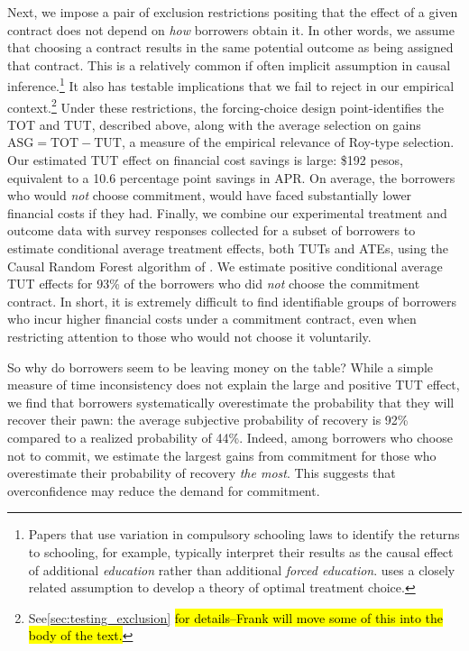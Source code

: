 \documentclass[12pt, a4paper]{article}
\begin{document}
Next, we impose a pair of exclusion restrictions positing that the effect of a given contract does not depend on \emph{how} borrowers obtain it. In other words, we assume that choosing a contract results in the same potential outcome as being assigned that contract. This is a relatively common if often implicit assumption in causal inference.\footnote{Papers that use variation in compulsory schooling laws to identify the returns to schooling, for example, typically interpret their results as the causal effect of additional \emph{education} rather than additional \emph{forced education}. \cite{chamberlain2011bayesian} uses a closely related assumption to develop a theory of optimal treatment choice.} 
It also has testable implications that we fail to reject in our empirical context.\footnote{See\autoref{sec:testing_exclusion} \hl{for details--Frank will move some of this into the body of the text.}}
Under these restrictions, the forcing-choice design point-identifies the TOT and TUT, described above, along with the average selection on gains $\text{ASG} = \text{TOT} - \text{TUT}$, a measure of the empirical relevance of Roy-type selection.
Our estimated TUT effect on financial cost savings is large: \$192 pesos, equivalent to a 10.6 percentage point savings in APR. On average, the borrowers who would \emph{not} choose commitment, would have faced substantially lower financial costs if they had. 
Finally, we combine our experimental treatment and outcome data with survey responses collected for a subset of borrowers to estimate conditional average treatment effects, both TUTs and ATEs, using the Causal Random Forest algorithm of \cite{atheygrf}. We estimate positive conditional average TUT effects for 93\% of the borrowers who did \textit{not} choose the commitment contract. In short, it is extremely difficult to find identifiable groups of borrowers who incur higher financial costs under a commitment contract, even when restricting attention to those who would not choose it voluntarily. 

So why do borrowers seem to be leaving money on the table? 
While a simple measure of time inconsistency does not explain the large and positive TUT effect, we find that borrowers systematically overestimate the probability that they will recover their pawn: the average subjective probability of recovery is 92\% compared to a realized probability of 44\%.
Indeed, among borrowers who choose not to commit, we estimate the largest gains from commitment for those who overestimate their probability of recovery \emph{the most}.
This suggests that overconfidence may reduce the demand for commitment.
\end{document}
